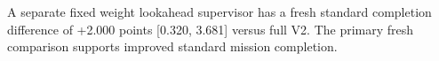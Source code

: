 A separate fixed weight lookahead supervisor has a fresh standard completion difference of +2.000 points [0.320, 3.681] versus full V2. The primary fresh comparison supports improved standard mission completion.
